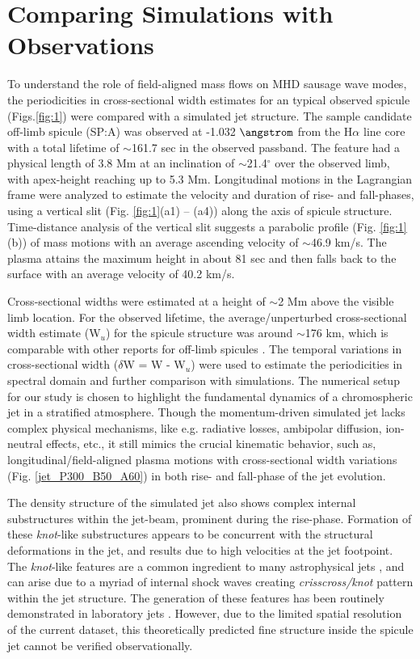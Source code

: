 \section{Comparing Simulations with Observations}
To understand the role of field-aligned mass flows on MHD sausage wave modes, the periodicities in cross-sectional width estimates for an typical observed spicule (Figs.\ref{fig:1}) were compared with a simulated jet structure. The sample candidate off-limb spicule (SP:A) was observed at -1.032 $\angstrom$ from the H$\alpha$ line core with a total lifetime of $\sim$161.7 sec in the observed passband. The feature had a physical length of 3.8 Mm at an inclination of $\sim$21.4$^\circ$ over the observed limb, with apex-height reaching up to 5.3 Mm. Longitudinal motions in the Lagrangian frame were analyzed to estimate the velocity and duration of rise- and fall-phases, using a vertical slit (Fig. \ref{fig:1}(a1) – (a4)) along the axis of spicule structure. Time-distance analysis of the vertical slit suggests a parabolic profile (Fig. \ref{fig:1}(b)) of mass motions with an average ascending velocity of $\sim$46.9 km/s. The plasma attains the maximum height in about 81 sec and then falls back to the surface with an average velocity of 40.2 km/s. 

Cross-sectional widths were estimated at a height of $\sim$2 Mm above the visible limb location. For the observed lifetime, the average/unperturbed cross-sectional width estimate (W$_{u}$) for the spicule structure was around $\sim$176 km, which is comparable with other reports for off-limb spicules \citep{Sharma2018}. The temporal variations in cross-sectional width ($\delta$W = W - W$_{u}$) were used to estimate the periodicities in spectral domain and further comparison with simulations. The numerical setup for our study is chosen to highlight the fundamental dynamics of a chromospheric jet in a stratified atmosphere. Though the momentum-driven simulated jet lacks complex physical mechanisms, like e.g. radiative losses, ambipolar diffusion, ion-neutral effects, etc., it still mimics the crucial kinematic behavior, such as, longitudinal/field-aligned plasma motions with cross-sectional width variations (Fig. \ref{jet_P300_B50_A60}) in both rise- and fall-phase of the jet evolution. 

The density structure of the simulated jet also shows complex internal substructures within the jet-beam, prominent during the rise-phase. Formation of these \textit{knot}-like substructures appears to be concurrent with the structural deformations in the jet, and results due to high velocities at the jet footpoint. The \textit{knot}-like features are a common ingredient to many astrophysical jets \citep{Norman1982}, and can arise due to a myriad of internal shock waves creating \textit{crisscross/knot} pattern within the jet structure. The generation of these features has been routinely demonstrated in laboratory jets \citep{Menon2010ShWav20175M,Edgington_Mitchell2014,Ono2014}. However, due to the limited spatial resolution of the current dataset, this theoretically predicted fine structure inside the spicule jet cannot be verified observationally.

